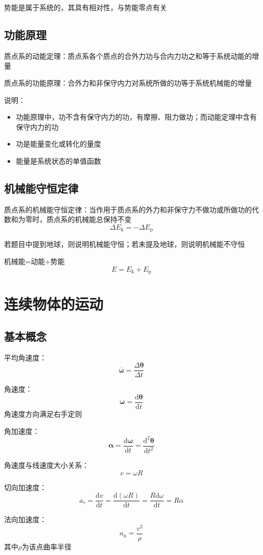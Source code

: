 \documentclass[12pt, a4paper, twoside]{ctexbook}
\begin{document}
势能是属于系统的，其具有相对性，与势能零点有关
\section{功能原理}
{\sonti 质点系的动能定理}：质点系各个质点的合外力功与合内力功之和等于系统动能的增量

{\sonti 质点系的功能原理}：合外力和非保守内力对系统所做的功等于系统机械能的增量

{\sonti 说明}：
\begin{itemize}
    \item 功能原理中，功不含有保守内力的功，有摩擦、阻力做功；而动能定理中含有保守内力的功
    \item 功是能量变化或转化的量度
    \item 能量是系统状态的单值函数
\end{itemize}
\section{机械能守恒定律}
{\sonti 质点系的机械能守恒定律}：当作用于质点系的外力和非保守力不做功或所做功的代数和为零时，质点系的机械能总保持不变
$$
\Delta E_\mathrm{k}=-\Delta E_\mathrm{p}
$$

若题目中提到地球，则说明机械能守恒；若未提及地球，则说明机械能不守恒

机械能=动能+势能
$$
E=E_\mathrm{k}+E_\mathrm{p}
$$
\chapter{连续物体的运动}
\newpage
\section{基本概念}
{\sonti 平均角速度}：
$$
\overline{\boldsymbol{\omega}}=\frac{\Delta \boldsymbol{\theta}}{\Delta t}
$$

{\sonti 角速度}：
$$
\boldsymbol{\omega}=\frac{\mathrm{d}\boldsymbol{\theta}}{\mathrm{d}t}
$$
角速度方向满足右手定则

{\sonti 角加速度}：
$$
\boldsymbol{\alpha}=\frac{\mathrm{d}\boldsymbol{\omega}}{\mathrm{d}t}= \frac{\mathrm{d}^2\boldsymbol{\theta}}{\mathrm{d}t^2}
$$

{\sonti 角速度与线速度大小关系}：
$$
v=\omega R
$$

{\sonti 切向加速度}：
$$
a_\tau=\frac{\mathrm{d}v}{\mathrm{d}t}=\frac{\mathrm{d}\left(\omega R\right)}{\mathrm{d}t}=\frac{R\mathrm{d}\omega}{\mathrm{d}t}=R\alpha
$$

{\sonti 法向加速度}：
$$
a_\mathrm{n}=\frac{v^2}{\rho}
$$
其中$\rho$为该点曲率半径
\end{document}
